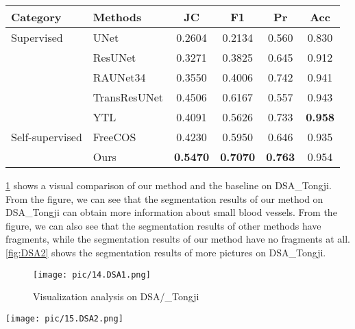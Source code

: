 \begin{table*}[t]
    \centering
    \caption{Quantitative evaluation of Our Method compared with different methods on the DSA\_Tongji dataset}
    \label{tab:tongji_results}
    \begin{tabular}{llcccc}
    \toprule
    \textbf{Category} & \textbf{Methods} & \textbf{JC} & \textbf{F1} & \textbf{Pr} & \textbf{Acc} \\
    \midrule
    \multirow{}{}{Supervised} 
    & UNet         & 0.2604 & 0.2134 & 0.560 & 0.830 \\
    & ResUNet      & 0.3271 & 0.3825 & 0.645 & 0.912 \\
    & RAUNet34     & 0.3550 & 0.4006 & 0.742 & 0.941 \\
    & TransResUNet & 0.4506 & 0.6167 & 0.557 & 0.943 \\
    & YTL          & 0.4091 & 0.5626 & 0.733 & \textbf{0.958} \\
    \midrule
    \multirow{}{}{Self-supervised}
    & FreeCOS      & 0.4230 & 0.5950 & 0.646 & 0.935 \\
    & Ours         & \textbf{0.5470} & \textbf{0.7070} & \textbf{0.763} & 0.954 \\
    \bottomrule
    \end{tabular}
    \label{tab:myT04}
\end{table*}

\cref{fig:DSA1} shows a visual comparison of our method and the baseline on DSA\_Tongji. 
From the figure, we can see that the segmentation results of our method on DSA\_Tongji can obtain more information about small blood vessels. 
From the figure, we can also see that the segmentation results of other methods have fragments, 
while the segmentation results of our method have no fragments at all. 
\cref{fig:DSA2} shows the segmentation results of more pictures on DSA\_Tongji.

\begin{figure}[htbp]
    \centering
    \texttt{[image: pic/14.DSA1.png]}
    \caption{Visualization analysis on DSA/_Tongji }
    \label{fig:DSA1}
\end{figure}

\begin{figure*}[htbp]
    \centering
    \texttt{[image: pic/15.DSA2.png]}
    \caption{More segmentation results on DSA\_Tongji}
    \label{fig:DSA2}
\end{figure*}

